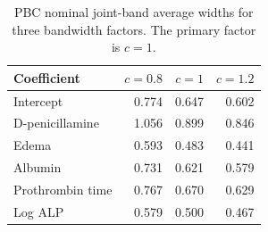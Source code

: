 \begin{table}[!tbp]
\centering
\caption{PBC nominal joint-band average widths for three bandwidth factors. The primary factor is $c=1$.}\label{tab:pbc-new}
\begin{tabular}{lrrr}
\toprule
Coefficient & $c=0.8$ & $c=1$ & $c=1.2$\\
\midrule
Intercept & 0.774 & 0.647 & 0.602\\
D-penicillamine & 1.056 & 0.899 & 0.846\\
Edema & 0.593 & 0.483 & 0.441\\
Albumin & 0.731 & 0.621 & 0.579\\
Prothrombin time & 0.767 & 0.670 & 0.629\\
Log ALP & 0.579 & 0.500 & 0.467\\
\bottomrule\end{tabular}\end{table}
